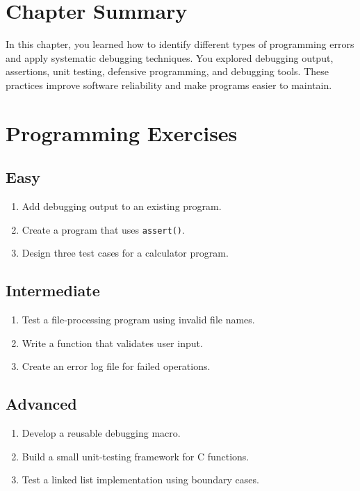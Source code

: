\documentclass[12pt,openany]{book}
\begin{document}
\section{Chapter Summary}

In this chapter, you learned how to identify different types of programming errors and apply systematic debugging techniques. You explored debugging output, assertions, unit testing, defensive programming, and debugging tools. These practices improve software reliability and make programs easier to maintain.

\section{Programming Exercises}

\subsection*{Easy}

\begin{enumerate}
    \item Add debugging output to an existing program.
    \item Create a program that uses \texttt{assert()}.
    \item Design three test cases for a calculator program.
\end{enumerate}

\subsection*{Intermediate}

\begin{enumerate}
    \item Test a file-processing program using invalid file names.
    \item Write a function that validates user input.
    \item Create an error log file for failed operations.
\end{enumerate}

\subsection*{Advanced}

\begin{enumerate}
    \item Develop a reusable debugging macro.
    \item Build a small unit-testing framework for C functions.
    \item Test a linked list implementation using boundary cases.
\end{enumerate}
\end{document}
